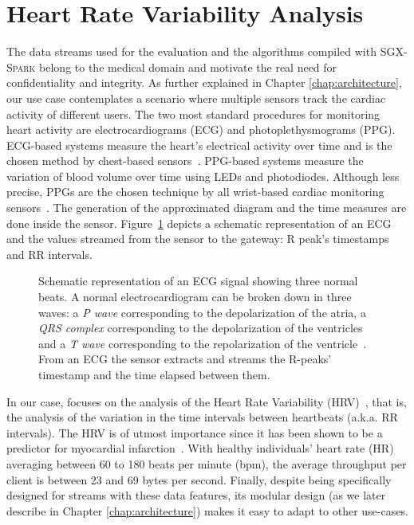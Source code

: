 \section{Heart Rate Variability Analysis} \label{sec:background:med}
The data streams used for the evaluation and the algorithms compiled with \textsc{SGX-Spark} belong to the medical domain and motivate the real need for confidentiality and integrity. 
As further explained in Chapter \ref{chap:architecture}, our use case contemplates a scenario where multiple sensors track the cardiac activity of different users.
The two most standard procedures for monitoring heart activity are electrocardiograms (ECG) and photoplethysmograms (PPG).
ECG-based systems measure the heart's electrical activity over time and is the chosen method by chest-based sensors~\cite{Tamura2018}.
PPG-based systems measure the variation of blood volume over time using LEDs and photodiodes.
Although less precise, PPGs are the chosen technique by all wrist-based cardiac monitoring sensors~\cite{Parak2015}.
The generation of the approximated diagram and the time measures are done inside the sensor.
Figure~\ref{fig:ecg-hrv} depicts a schematic representation of an ECG and the values streamed from the sensor to the gateway: R peak's timestamps and RR intervals. 
\begin{figure}[h!]
    \centering
    
    \caption[Schematic representation of an ECG signal showing three normal beats.]{Schematic representation of an ECG signal showing three normal beats. A normal electrocardiogram can be broken down in three waves: a \textit{P wave} corresponding to the depolarization of the atria, a \textit{QRS complex} corresponding to the depolarization of the ventricles and a \textit{T wave} corresponding to the repolarization of the ventricle~\cite{Lilly2001}. From an ECG the sensor extracts and streams the R-peaks' timestamp and the time elapsed between them. \label{fig:ecg-hrv}}
\end{figure}

In our case, \projName focuses on the analysis of the Heart Rate Variability (HRV)~\cite{Camm1996}, that is, the analysis of the variation in the time intervals between heartbeats (a.k.a. RR intervals).
The HRV is of utmost importance since it has been shown to be a predictor for myocardial infarction~\cite{Kleiger1987,Bigger1992}.
With healthy individuals' heart rate (HR) averaging between 60 to 180 beats per minute (bpm), the average throughput per client is between 23 and 69 bytes per second.
Finally, despite \projName being specifically designed for streams with these data features, its modular design (as we later describe in Chapter \ref{chap:architecture}) makes it easy to adapt to other use-cases.
